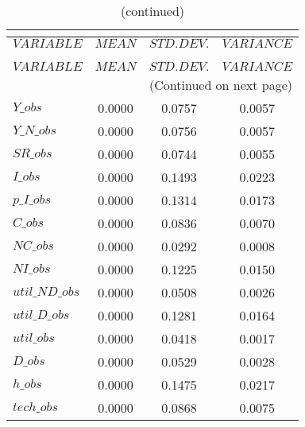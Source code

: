  
\begin{center}
\begin{longtable}{lccc} 
\caption{THEORETICAL MOMENTS}\\
 \label{Table:th_moments}\\
\toprule 
$VARIABLE       $	 & 	 $         MEAN$	 & 	 $    STD. DEV.$	 & 	 $     VARIANCE$\\
\midrule \endfirsthead 
\caption{(continued)}\\
 \toprule \\ 
$VARIABLE       $	 & 	 $         MEAN$	 & 	 $    STD. DEV.$	 & 	 $     VARIANCE$\\
\midrule \endhead 
\midrule \multicolumn{4}{r}{(Continued on next page)} \\ \bottomrule \endfoot 
\bottomrule \endlastfoot 
$Y\_obs         $	 & 	       0.0000	 & 	       0.0757	 & 	       0.0057 \\ 
$Y\_N\_obs      $	 & 	       0.0000	 & 	       0.0756	 & 	       0.0057 \\ 
$SR\_obs        $	 & 	       0.0000	 & 	       0.0744	 & 	       0.0055 \\ 
$I\_obs         $	 & 	       0.0000	 & 	       0.1493	 & 	       0.0223 \\ 
$p\_I\_obs      $	 & 	       0.0000	 & 	       0.1314	 & 	       0.0173 \\ 
$C\_obs         $	 & 	       0.0000	 & 	       0.0836	 & 	       0.0070 \\ 
$NC\_obs        $	 & 	       0.0000	 & 	       0.0292	 & 	       0.0008 \\ 
$NI\_obs        $	 & 	       0.0000	 & 	       0.1225	 & 	       0.0150 \\ 
$util\_ND\_obs  $	 & 	       0.0000	 & 	       0.0508	 & 	       0.0026 \\ 
$util\_D\_obs   $	 & 	       0.0000	 & 	       0.1281	 & 	       0.0164 \\ 
$util\_obs      $	 & 	       0.0000	 & 	       0.0418	 & 	       0.0017 \\ 
$D\_obs         $	 & 	       0.0000	 & 	       0.0529	 & 	       0.0028 \\ 
$h\_obs         $	 & 	       0.0000	 & 	       0.1475	 & 	       0.0217 \\ 
$tech\_obs      $	 & 	       0.0000	 & 	       0.0868	 & 	       0.0075 \\ 
\end{longtable}
 \end{center}

